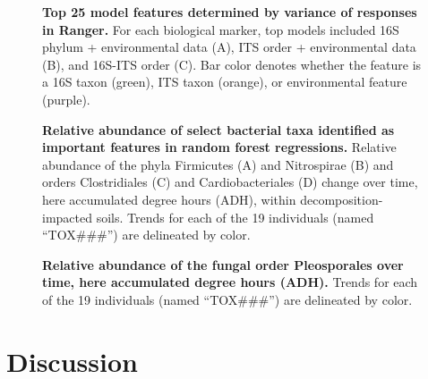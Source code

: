 \documentclass[
  10pt,
  letterpaper,
]{article}
\begin{document}
\begin{figure}[!h]
\caption{{\bf Top 25 model features determined by variance of responses in Ranger.}
For each biological marker, top models included 16S phylum + environmental data (A), ITS order + environmental data (B), and 16S-ITS order (C). Bar color denotes whether the feature is a 16S taxon (green), ITS taxon (orange), or environmental feature (purple).}
\label{fig5}
\end{figure}

\begin{figure}[!h]
\caption{{\bf Relative abundance of select bacterial taxa identified as important features in random forest regressions.}
Relative abundance of the phyla Firmicutes (A) and Nitrospirae (B) and orders Clostridiales (C) and Cardiobacteriales (D) change over time, here accumulated degree hours (ADH), within decomposition-impacted soils. Trends for each of the 19 individuals (named “TOX\#\#\#”) are delineated by color.}
\label{fig6}
\end{figure}

\begin{figure}[!h]
\caption{{\bf Relative abundance of the fungal order Pleosporales over time, here accumulated degree hours (ADH).}
Trends for each of the 19 individuals (named “TOX\#\#\#”) are delineated by color.}
\label{fig7}
\end{figure}

\hypertarget{discussion}{%
\section{Discussion}\label{discussion}}
\end{document}
